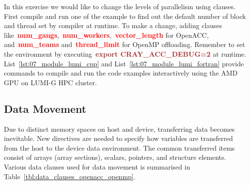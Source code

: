 \par
In this exercise we would like to change the levels of parallelism using clauses.
First compile and run one of the example to find out the default number of block and thread set by compiler at runtime.
To make a change, adding clauses like~\textbf{\textcolor{red}{num\_gangs}},~\textbf{\textcolor{red}{num\_workers}},~\textbf{\textcolor{red}{vector\_length}} for OpenACC, and~\textbf{\textcolor{red}{num\_teams}} and~\textbf{\textcolor{red}{thread\_limit}} for OpenMP offloading.
Remember to set the environment by executing~\textbf{\textcolor{brown}{export CRAY\_ACC\_DEBUG=2}} at runtime.
List~\ref{lst:07_module_lumi_cpp} and List~\ref{lst:07_module_lumi_fortran} provide commands to compile and run the code examples interactively using the AMD GPU on LUMI-G HPC cluster.










\subsection{Data Movement}

\par
Due to distinct memory spaces on host and device, transferring data becomes inevitable.
New directives are needed to specify how variables are transferred from the host to the device data environment.
The common transferred items consist of arrays (array sections), scalars, pointers, and structure elements.
Various data clauses used for data movement is summarised in Table~\ref{tbl:data_clauses_openacc_openmp}.

